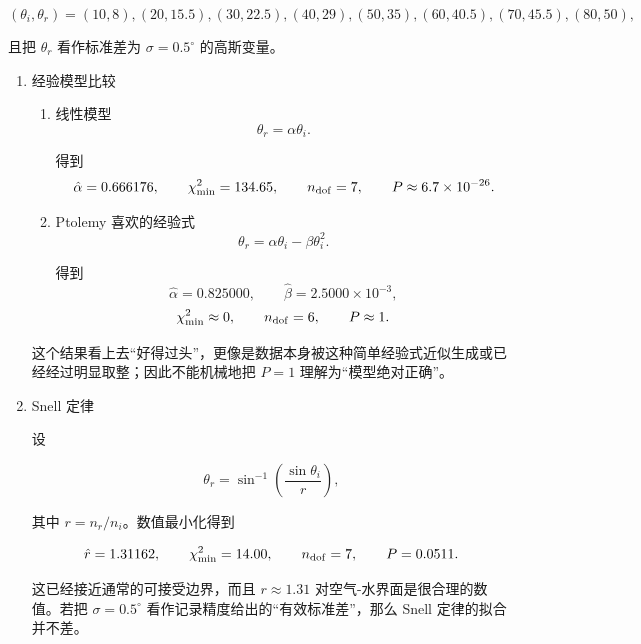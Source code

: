 \begin{question}
\begin{solution}
\[
(\theta_i,\theta_r)=
(10,8),(20,15.5),(30,22.5),(40,29),(50,35),(60,40.5),(70,45.5),(80,50),
\]

且把 \(\theta_r\) 看作标准差为 \(\sigma=0.5^\circ\) 的高斯变量。

\begin{enumerate}
\item 经验模型比较

\begin{enumerate}
\item
  线性模型 \[
  \theta_r=\alpha\theta_i.
  \]

  得到 \[
  \hat\alpha=0.666176,
  \qquad
  \chi^2_{\min}=134.65,
  \qquad
  n_{\rm dof}=7,
  \qquad
  P\approx6.7\times10^{-26}.
  \]
\item
  Ptolemy 喜欢的经验式 \[
  \theta_r=\alpha\theta_i-\beta\theta_i^2.
  \]

  得到 \[
  \hat\alpha=0.825000,
  \qquad
  \hat\beta=2.5000\times10^{-3},
  \] \[
  \chi^2_{\min}\approx0,
  \qquad
  n_{\rm dof}=6,
  \qquad
  P\approx1.
  \]
\end{enumerate}

这个结果看上去``好得过头''，更像是数据本身被这种简单经验式近似生成或已经经过明显取整；因此不能机械地把
\(P=1\) 理解为``模型绝对正确''。

\item Snell 定律

设

\[
\theta_r=\sin^{-1}\!\left(\frac{\sin\theta_i}{r}\right),
\]

其中 \(r=n_r/n_i\)。数值最小化得到

\[
\hat r=1.31162,
\qquad
\chi^2_{\min}=14.00,
\qquad
n_{\rm dof}=7,
\qquad
P=0.0511.
\]

这已经接近通常的可接受边界，而且 \(r\approx1.31\)
对空气-水界面是很合理的数值。若把 \(\sigma=0.5^\circ\)
看作记录精度给出的``有效标准差''，那么 Snell 定律的拟合并不差。
\end{enumerate}
\end{solution}
\end{question}



